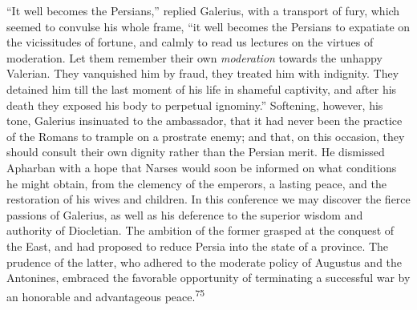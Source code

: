 
“It well becomes the Persians,” replied Galerius, with a
transport of fury, which seemed to convulse his whole frame, “it
well becomes the Persians to expatiate on the vicissitudes of
fortune, and calmly to read us lectures on the virtues of
moderation. Let them remember their own \textit{moderation} towards the
unhappy Valerian. They vanquished him by fraud, they treated him
with indignity. They detained him till the last moment of his
life in shameful captivity, and after his death they exposed his
body to perpetual ignominy.” Softening, however, his tone,
Galerius insinuated to the ambassador, that it had never been the
practice of the Romans to trample on a prostrate enemy; and that,
on this occasion, they should consult their own dignity rather
than the Persian merit. He dismissed Apharban with a hope that
Narses would soon be informed on what conditions he might obtain,
from the clemency of the emperors, a lasting peace, and the
restoration of his wives and children. In this conference we may
discover the fierce passions of Galerius, as well as his
deference to the superior wisdom and authority of Diocletian. The
ambition of the former grasped at the conquest of the East, and
had proposed to reduce Persia into the state of a province. The
prudence of the latter, who adhered to the moderate policy of
Augustus and the Antonines, embraced the favorable opportunity of
terminating a successful war by an honorable and advantageous
peace.\textsuperscript{75}


